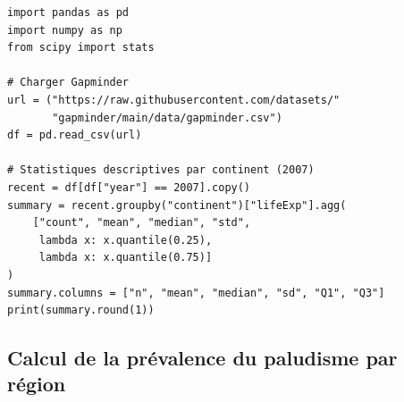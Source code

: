 \begin{verbatim}
import pandas as pd
import numpy as np
from scipy import stats

# Charger Gapminder
url = ("https://raw.githubusercontent.com/datasets/"
       "gapminder/main/data/gapminder.csv")
df = pd.read_csv(url)

# Statistiques descriptives par continent (2007)
recent = df[df["year"] == 2007].copy()
summary = recent.groupby("continent")["lifeExp"].agg(
    ["count", "mean", "median", "std",
     lambda x: x.quantile(0.25),
     lambda x: x.quantile(0.75)]
)
summary.columns = ["n", "mean", "median", "sd", "Q1", "Q3"]
print(summary.round(1))
\end{verbatim}

\subsection{Calcul de la pr\'evalence du paludisme par r\'egion}

